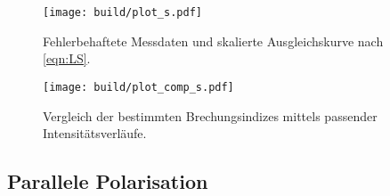 \begin{figure}[H]
	\texttt{[image: build/plot\_s.pdf]}
	\caption{Fehlerbehaftete Messdaten und skalierte Ausgleichskurve nach \eqref{eqn:LS}.}
	\label{fig:plot_s}
\end{figure}

\begin{figure}[H]
	\texttt{[image: build/plot\_comp\_s.pdf]}
	\captionsetup{width=\linewidth}
	\caption{Vergleich der bestimmten Brechungsindizes mittels passender Intensitätsverläufe.}
	\label{fig:plot_comp_s}
\end{figure}

\newpage
\subsection{Parallele Polarisation}

